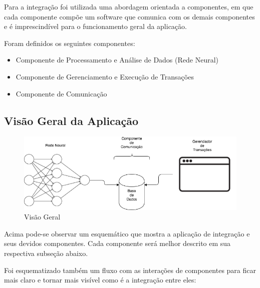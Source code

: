 Para a integração foi utilizada uma abordagem orientada a componentes, em que cada componente compõe um software que comunica com os demais componentes e é imprescindível para o funcionamento geral da aplicação.

Foram definidos os seguintes componentes:

\begin{itemize}
  \item Componente de Processamento e Análise de Dados (Rede Neural)
	\item Componente de Gerenciamento e Execução de Transações
	\item Componente de Comunicação
\end{itemize}

\subsection[Visão Geral da Aplicação]{Visão Geral da Aplicação}

\begin{figure}[h]
	\centering
	\includegraphics[keepaspectratio=true,scale=0.6]{figuras/dia.png}
	\caption{Visão Geral }
	\label{fig12}
\end{figure}

\pagebreak

Acima pode-se observar um esquemático que mostra a aplicação de integração e seus devidos componentes. Cada componente será melhor descrito em sua respectiva subseção abaixo.

Foi esquematizado também um fluxo com as interações de componentes para ficar mais claro e tornar mais visível como é a integração entre eles:

